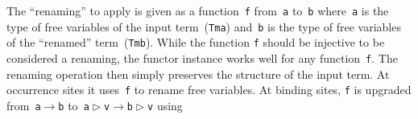 \documentclass[9pt,preprint,authoryear]{sigplanconf}
\begin{document}
%
The {``}renaming{''} to apply is given as a function{~}\textcolor[rgb]{0,0,0.80}{\texttt{f}} from{~}\textcolor[rgb]{0,0,0.80}{\texttt{a}}    to{~}\textcolor[rgb]{0,0,0.80}{\texttt{b}} where{~}\textcolor[rgb]{0,0,0.80}{\texttt{a}} is the type of free variables of the input
    term{~}(\textcolor[rgb]{0,0,0.80}{\texttt{Tm}}\textcolor[rgb]{0,0,0.80}{\texttt{\mbox{\hspace{0.50em}}}}\textcolor[rgb]{0,0,0.80}{\texttt{a}}) and{~}\textcolor[rgb]{0,0,0.80}{\texttt{b}} is the type of free variables of the
    {``}renamed{''} term{~}(\textcolor[rgb]{0,0,0.80}{\texttt{Tm}}\textcolor[rgb]{0,0,0.80}{\texttt{\mbox{\hspace{0.50em}}}}\textcolor[rgb]{0,0,0.80}{\texttt{b}}). While the function \textcolor[rgb]{0,0,0.80}{\texttt{f}} should be injective
    to be considered a renaming, the functor instance
    works well for any function{~}\textcolor[rgb]{0,0,0.80}{\texttt{f}}. The renaming operation then
    simply preserves the structure of the input term. At occurrence
    sites it uses{~}\textcolor[rgb]{0,0,0.80}{\texttt{f}} to rename free variables. At binding sites,
    \textcolor[rgb]{0,0,0.80}{\texttt{f}} is upgraded from{~}\textcolor[cmyk]{0,0.65,0.99,0}{\texttt{\makebox[1.22ex][l]{$ {(} $}}}\textcolor[rgb]{0,0,0.80}{\texttt{a}}\textcolor[rgb]{0,0,0.80}{\texttt{\mbox{\hspace{0.50em}}}}\textcolor[cmyk]{0,0.65,0.99,0}{\texttt{$ \rightarrow $}}\textcolor[rgb]{0,0,0.80}{\texttt{\mbox{\hspace{0.50em}}}}\textcolor[rgb]{0,0,0.80}{\texttt{b}}\textcolor[cmyk]{0,0.65,0.99,0}{\texttt{\makebox[1.22ex][r]{$ {)} $}}} to{~}\textcolor[cmyk]{0,0.65,0.99,0}{\texttt{\makebox[1.22ex][l]{$ {(} $}}}\textcolor[rgb]{0,0,0.80}{\texttt{a}}\textcolor[rgb]{0,0,0.80}{\texttt{\mbox{\hspace{0.50em}}}}\textcolor[rgb]{0,0,0.80}{\texttt{$ \vartriangleright $}}\textcolor[rgb]{0,0,0.80}{\texttt{\mbox{\hspace{0.50em}}}}\textcolor[rgb]{0,0,0.80}{\texttt{v}}\textcolor[rgb]{0,0,0.80}{\texttt{\mbox{\hspace{0.50em}}}}\textcolor[cmyk]{0,0.65,0.99,0}{\texttt{$ \rightarrow $}}\textcolor[rgb]{0,0,0.80}{\texttt{\mbox{\hspace{0.50em}}}}\textcolor[rgb]{0,0,0.80}{\texttt{b}}\textcolor[rgb]{0,0,0.80}{\texttt{\mbox{\hspace{0.50em}}}}\textcolor[rgb]{0,0,0.80}{\texttt{$ \vartriangleright $}}\textcolor[rgb]{0,0,0.80}{\texttt{\mbox{\hspace{0.50em}}}}\textcolor[rgb]{0,0,0.80}{\texttt{v}}\textcolor[cmyk]{0,0.65,0.99,0}{\texttt{\makebox[1.22ex][r]{$ {)} $}}} using
\end{document}
